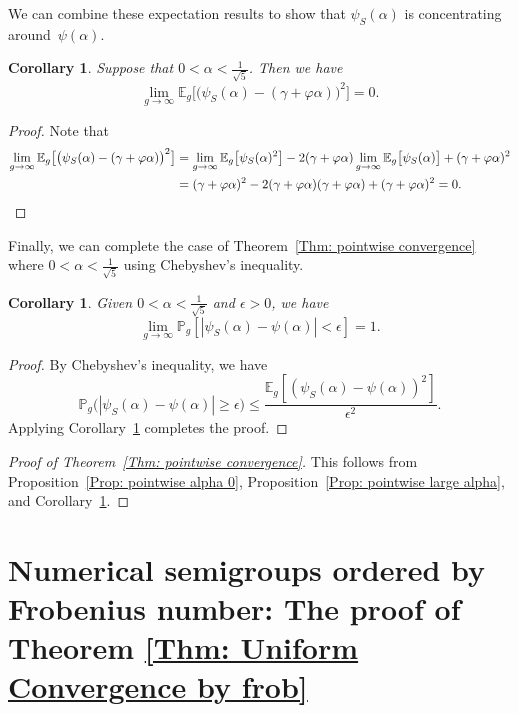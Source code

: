 \documentclass[12pt]{amsart}
\def\E{{\mathbb E}}
\renewcommand{\phi}{\varphi}
\renewcommand{\P}{\mathbb{P}}
\newtheorem{corollary}[theorem]{Corollary}
\begin{document}
We can combine these expectation results to show that $\psi_S(\alpha)$ is concentrating around~$\psi(\alpha)$.


\begin{corollary}\label{Cor: small alpha exp concentration}
Suppose that $0<\alpha<\frac{1}{\sqrt{5}}$.
Then we have
\[\lim_{g\to\infty} \E_g \big[ \big(\psi_S(\alpha) -(\gamma+\phi\alpha) \big)^2\big] = 0. \]
\end{corollary}
\begin{proof}
Note that
\begin{align*}
\lim_{g\to\infty} \E_g \big[ \big(\psi_S(\alpha) -(\gamma+\phi\alpha) \big)^2\big]
&=\lim_{g\to\infty} \E_g \big[ \psi_S(\alpha)^2\big]
-2(\gamma+\phi\alpha)\lim_{g\to\infty} \E_g \big[ \psi_S(\alpha) \big]
+ (\gamma+\phi\alpha)^2\\
&=(\gamma+\phi\alpha)^2
-2(\gamma+\phi\alpha)(\gamma+\phi\alpha)
+ (\gamma+\phi\alpha)^2 =0. \qedhere
\end{align*}
\end{proof}

Finally, we can complete the case of Theorem~\ref{Thm: pointwise convergence} where $0<\alpha<\frac{1}{\sqrt{5}}$ using Chebyshev's inequality.

\begin{corollary}\label{Cor: pointwise small alpha}
Given $0<\alpha<\frac{1}{\sqrt{5}}$ and $\epsilon>0$, we have
\[\lim_{g\to\infty} \P_g[ |\psi_S(\alpha) -\psi(\alpha)|<\epsilon ] =1.\]
\end{corollary}
\begin{proof}
By Chebyshev's inequality, we have
\[
\P_g\big(|\psi_S(\alpha)-\psi(\alpha)|\geq \epsilon\big)
\leq \frac{\E_g[(\psi_S(\alpha)-\psi(\alpha))^2]}{\epsilon^2}.
\]
Applying Corollary~\ref{Cor: small alpha exp concentration} completes the proof.
\end{proof}


\begin{proof}[Proof of Theorem~\ref{Thm: pointwise convergence}]
This follows from Proposition~\ref{Prop: pointwise alpha 0}, Proposition~\ref{Prop: pointwise large alpha}, and Corollary~\ref{Cor: pointwise small alpha}.
\end{proof}









\section{Numerical semigroups ordered by Frobenius number: The proof of Theorem \ref{Thm: Uniform Convergence by frob}}\label{Sec: proof for frob}
\end{document}
